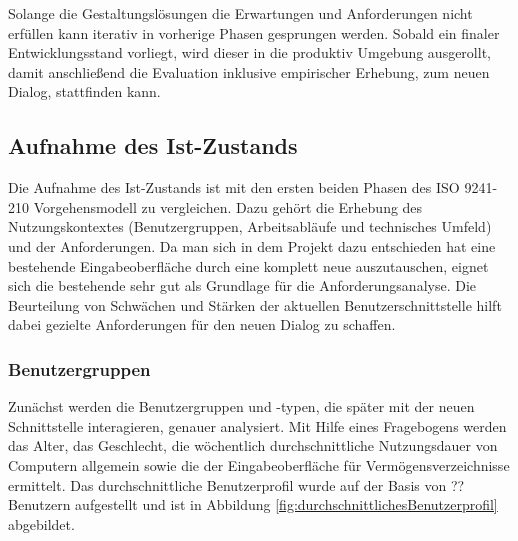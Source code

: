 Solange die Gestaltungslösungen die Erwartungen und Anforderungen nicht erfüllen kann iterativ in vorherige Phasen gesprungen werden. Sobald ein finaler Entwicklungsstand vorliegt, wird dieser in die produktiv Umgebung ausgerollt, damit anschließend die Evaluation inklusive empirischer Erhebung, zum neuen Dialog, stattfinden kann.


\subsection{Aufnahme des Ist-Zustands}
Die Aufnahme des Ist-Zustands ist mit den ersten beiden Phasen des ISO 9241-210 Vorgehensmodell zu vergleichen. Dazu gehört die Erhebung des Nutzungskontextes (Benutzergruppen, Arbeitsabläufe und technisches Umfeld) und der Anforderungen. Da man sich in dem Projekt dazu entschieden hat eine bestehende Eingabeoberfläche durch eine komplett neue  auszutauschen, eignet sich die bestehende sehr gut als Grundlage für die Anforderungsanalyse. Die Beurteilung von Schwächen und Stärken der aktuellen Benutzerschnittstelle hilft dabei gezielte Anforderungen für den neuen Dialog zu schaffen.


\subsubsection{Benutzergruppen}
Zunächst werden die Benutzergruppen und -typen, die später mit der neuen Schnittstelle interagieren, genauer analysiert. Mit Hilfe eines Fragebogens werden das Alter, das Geschlecht, die wöchentlich durchschnittliche Nutzungsdauer von Computern allgemein sowie die der Eingabeoberfläche für Vermögensverzeichnisse ermittelt. Das durchschnittliche Benutzerprofil wurde auf der Basis von ?? Benutzern aufgestellt und ist in Abbildung \ref{fig:durchschnittlichesBenutzerprofil} abgebildet. 

